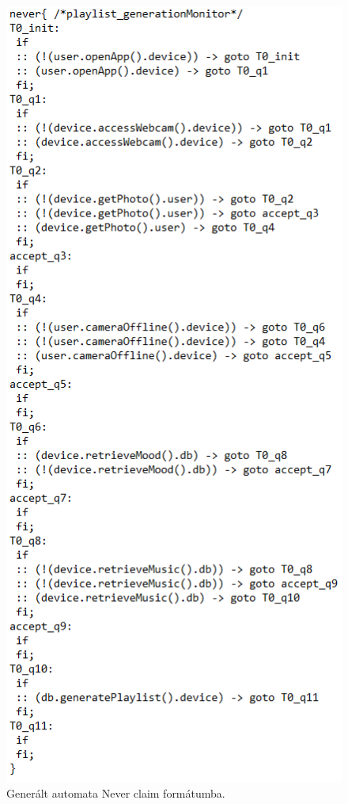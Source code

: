 \begin{figure}[!ht]
    \centering
    \includegraphics[width=150mm, keepaspectratio]{figures/20abra.png}
    \caption{Generált automata Never claim formátumba.}
\end{figure}


